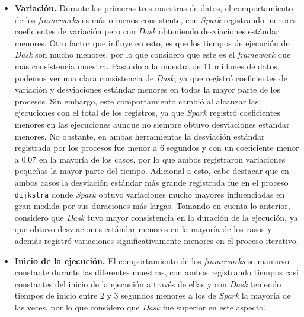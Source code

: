 \begin{itemize}
	\item \textbf{Variación.} Durante las primeras tres muestras de datos, el comportamiento de los \textit{frameworks} es más o menos consistente, con \textit{Spark} registrando menores coeficientes de variación pero con \textit{Dask} obteniendo desviaciones estándar menores. Otro factor que influye en esto, es que los tiempos de ejecución de \textit{Dask} son mucho menores, por lo que considero que este es el \textit{framework} que más consistencia muestra. Pasando a la muestra de 11 millones de datos, podemos ver una clara consistencia de \textit{Dask}, ya que registró coeficientes de variación y desviaciones estándar menores en todos la mayor parte de los procesos. Sin embargo, este comportamiento cambió al alcanzar las ejecuciones con el total de los registros, ya que \textit{Spark} registró coeficientes menores en las ejecuciones aunque no siempre obtuvo desviaciones estándar menores. No obstante, en ambas herramientas la desviación estándar registrada por los procesos fue menor a 6 segundos y con un coeficiente menor a 0.07 en la mayoría de los casos, por lo que ambos registraron variaciones pequeñas la mayor parte del tiempo. Adicional a esto, cabe destacar que en ambos casos la desviación estándar más grande registrada fue en el proceso \texttt{dijkstra} donde \textit{Spark} obtuvo variaciones mucho mayores influenciadas en gran medida por sus duraciones más largas. Tomando en cuenta lo anterior, considero que \textit{Dask} tuvo mayor consistencia en la duración de la ejecución, ya que obtuvo desviaciones estándar menores en la mayoría de los casos y además registró variaciones significativamente menores en el proceso iterativo.
	
	\item \textbf{Inicio de la ejecución.} El comportamiento de los \textit{frameworks} se mantuvo constante durante las diferentes muestras, con ambos registrando tiempos casi constantes del inicio de la ejecución a través de ellas y con \textit{Dask} teniendo tiempos de inicio entre 2 y 3 segundos menores a los de \textit{Spark} la mayoría de las veces, por lo que considero que \textit{Dask} fue superior en este aspecto.
	

\end{itemize}
